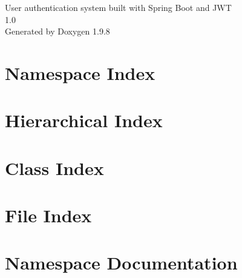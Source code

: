 \documentclass[twoside]{book}
\newcommand{\+}{\discretionary{\mbox{\scriptsize$\hookleftarrow$}}{}{}}
\newcommand{\clearemptydoublepage}{%
    \newpage{\pagestyle{empty}\cleardoublepage}%
  }
\begin{document}
  \raggedbottom
    \hypersetup{pageanchor=false,
                bookmarksnumbered=true,
                pdfencoding=unicode
               }
  \begin{titlepage}
  \vspace*{7cm}
  \begin{center}%
  {\Large User authentication system built with Spring Boot and JWT}\\
  [1ex]\large 1.\+0 \\
  \vspace*{1cm}
  {\large Generated by Doxygen 1.9.8}\\
  \end{center}
  \end{titlepage}
  \clearemptydoublepage
  \tableofcontents
  \clearemptydoublepage
  \hypersetup{pageanchor=true}
\chapter{Namespace Index}

\chapter{Hierarchical Index}

\chapter{Class Index}

\chapter{File Index}

\chapter{Namespace Documentation}














\end{document}
